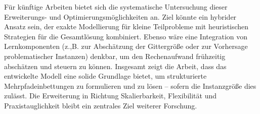 \documentclass[bachelor, german]{algothesis}
\begin{document}
Für künftige Arbeiten bietet sich die systematische Untersuchung dieser Erweiterungs- und Optimierungsmöglichkeiten an. Ziel könnte ein hybrider Ansatz sein, der exakte Modellierung für kleine Teilprobleme mit heuristischen Strategien für die Gesamtlösung kombiniert. Ebenso wäre eine Integration von Lernkomponenten (z.,B. zur Abschätzung der Gittergröße oder zur Vorhersage problematischer Instanzen) denkbar, um den Rechenaufwand frühzeitig abschätzen und steuern zu können.\newline 
Insgesamt zeigt die Arbeit, dass das entwickelte Modell eine solide Grundlage bietet, um strukturierte Mehrpfadeinbettungen zu formulieren und zu lösen – sofern die Instanzgröße dies zulässt. Die Erweiterung in Richtung Skalierbarkeit, Flexibilität und Praxistauglichkeit bleibt ein zentrales Ziel weiterer Forschung.

\clearpage


\end{document}
